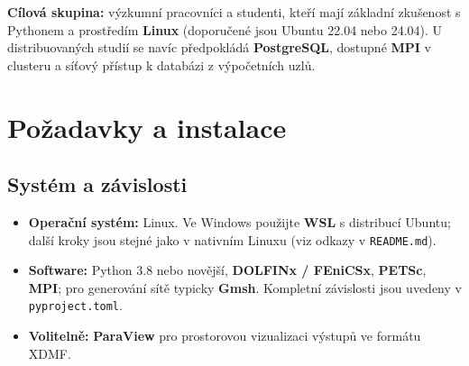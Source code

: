 \documentclass[a4paper,11pt]{article}
\begin{document}
\begin{center}
\end{center}

\noindent\textbf{Cílová skupina:} výzkumní pracovníci a studenti, kteří mají
základní zkušenost s Pythonem a prostředím \textbf{Linux} (doporučené jsou
Ubuntu 22.04 nebo 24.04). U distribuovaných studií se navíc předpokládá
\textbf{PostgreSQL}, dostupné \textbf{MPI} v clusteru a síťový přístup
k databázi z výpočetních uzlů.

\section{Požadavky a instalace}\label{sec:install}

\subsection*{Systém a závislosti}

\begin{itemize}
  \item \textbf{Operační systém:} Linux. Ve Windows použijte
        \textbf{WSL} s distribucí Ubuntu; další kroky jsou stejné jako
        v nativním Linuxu (viz odkazy v \texttt{README.md}).
  \item \textbf{Software:} Python 3.8 nebo novější, \textbf{DOLFINx / FEniCSx},
        \textbf{PETSc}, \textbf{MPI}; pro generování sítě typicky \textbf{Gmsh}.
        Kompletní závislosti jsou uvedeny v \texttt{pyproject.toml}.
  \item \textbf{Volitelně:} \textbf{ParaView} pro prostorovou vizualizaci výstupů
        ve formátu XDMF.
\end{itemize}
\end{document}
